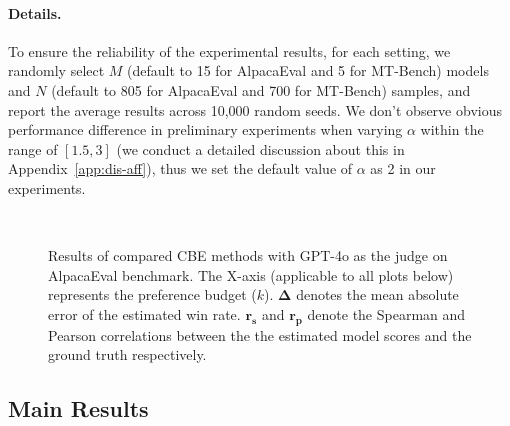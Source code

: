 \paragraph{Details.} 
To ensure the reliability of the experimental results, for each setting, we randomly select $M$ (default to 15 for AlpacaEval and 5 for MT-Bench) models and $N$ (default to 805 for AlpacaEval and 700 for MT-Bench) samples, and report the average results across 10,000 random seeds. We don't observe obvious performance difference in preliminary experiments when varying $\alpha$ within the range of $[1.5,3]$ (we conduct a detailed discussion about this in Appendix~\ref{app:dis-aff}), thus we set the default value of $\alpha$ as 2 in our experiments. 
\begin{figure}[h]
    \centering
    \hfill
    \hfill
     \\
    \hfill
    \hfill
    \vspace{-0.4cm}
    \caption{Results of compared CBE methods with GPT-4o as the judge on AlpacaEval benchmark. The X-axis (applicable to all plots below) represents the preference budget ($k$). $\mathbf{\Delta}$ denotes the mean absolute error of the estimated win rate. $\mathbf{r_s}$ and $\mathbf{r_p}$ denote the Spearman and Pearson correlations between the the estimated model scores and the ground truth respectively.}
    \vspace{-0.4cm}
    \label{fig:main-4o}
\end{figure}


\subsection{Main Results}
\label{sec:exp-1}
